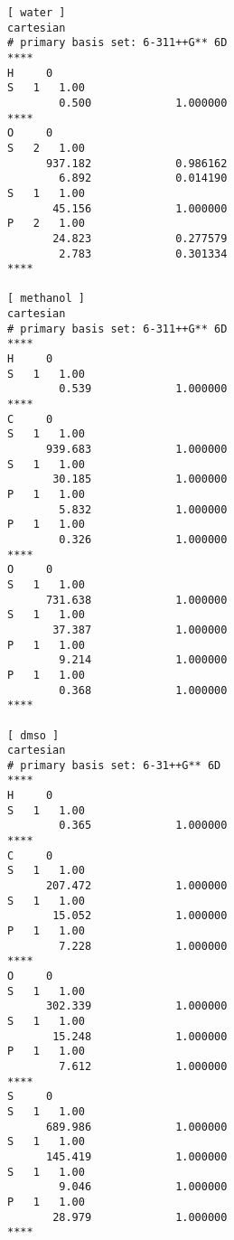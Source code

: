\begin{verbatim}
[ water ]
cartesian
# primary basis set: 6-311++G** 6D
****
H     0
S   1   1.00
        0.500             1.000000
****
O     0
S   2   1.00
      937.182             0.986162 
        6.892             0.014190 
S   1   1.00
       45.156             1.000000
P   2   1.00
       24.823             0.277579 
        2.783             0.301334 
****

[ methanol ]
cartesian
# primary basis set: 6-311++G** 6D
****
H     0
S   1   1.00
        0.539             1.000000
****
C     0
S   1   1.00
      939.683             1.000000
S   1   1.00
       30.185             1.000000
P   1   1.00
        5.832             1.000000
P   1   1.00
        0.326             1.000000
****
O     0
S   1   1.00
      731.638             1.000000
S   1   1.00
       37.387             1.000000
P   1   1.00
        9.214             1.000000
P   1   1.00
        0.368             1.000000
****

[ dmso ]
cartesian
# primary basis set: 6-31++G** 6D
****
H     0
S   1   1.00
        0.365             1.000000
****
C     0
S   1   1.00
      207.472             1.000000
S   1   1.00
       15.052             1.000000
P   1   1.00
        7.228             1.000000
****
O     0
S   1   1.00
      302.339             1.000000
S   1   1.00
       15.248             1.000000
P   1   1.00
        7.612             1.000000
****
S     0
S   1   1.00
      689.986             1.000000
S   1   1.00
      145.419             1.000000
S   1   1.00
        9.046             1.000000
P   1   1.00
       28.979             1.000000
****
\end{verbatim}






